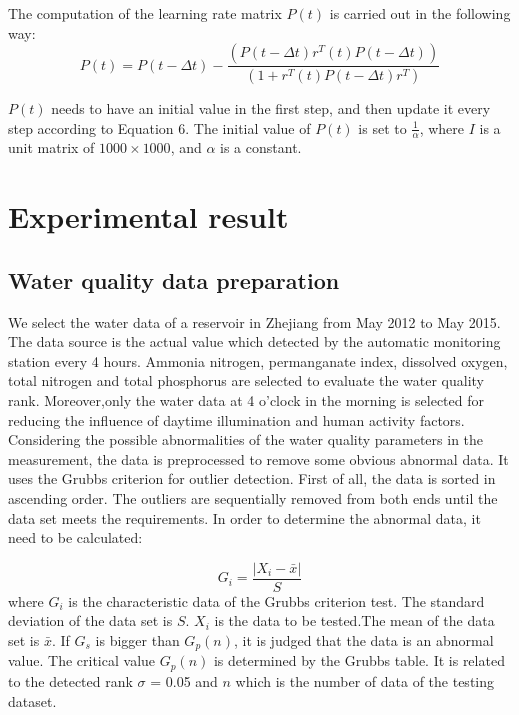 \documentclass[runningheads]{llncs}
\begin{document}
The computation of the learning rate matrix $P(t)$ is carried out in the following way:
\begin{equation}
P(t)  = P(t-\Delta t)-  \frac{(P(t-\Delta t) r^T (t)P(t-\Delta t))}{(1+r^T (t)P(t-\Delta t) r^T )}
\end{equation}

$P(t)$ needs to have an initial value in the first step,  
and then update it every step according to Equation 6. 
The initial value of $P(t)$ is set to $\frac{1}{\alpha}$, where $I$ is a unit matrix of $1000\times 1000$,
and $\alpha$ is a constant.


\section{Experimental result}
\subsection{Water quality data preparation}
We select the water data of a reservoir in Zhejiang 
from May 2012 to May 2015. The data source is the actual value
which detected by the automatic monitoring station every 4 hours.
Ammonia nitrogen, permanganate index, dissolved oxygen, 
total nitrogen and total phosphorus are selected to evaluate the water quality rank. 
Moreover,only the water data at 4 o'clock in the morning  is selected 
for reducing the influence of daytime illumination and human activity factors. 
Considering the possible abnormalities of the water quality 
parameters in the measurement, the data is preprocessed to remove 
some obvious abnormal data. It uses the Grubbs criterion for outlier 
detection. First of all, the data is sorted in ascending order. 
The outliers are sequentially removed from both ends until the data 
set meets the requirements. In order to determine the abnormal data, 
it need to be calculated:

\begin{equation}
G_i=\frac{\left|X_i- \bar x \right|}{S}   
\end{equation}
where $G_i$ is the characteristic data of the Grubbs criterion test.
The standard deviation of the data set is $S$.
$X_i$ is the data to be tested.The mean of the data set is $\bar x$. If $G_s$ 
is bigger than $G_p (n)$, it is judged that the data is an abnormal value. 
The critical value $G_p (n)$ is determined by the Grubbs table. 
It is related to the detected rank $\sigma$ = 0.05 
and  $n$ which is the number of data of the testing dataset.
\end{document}
